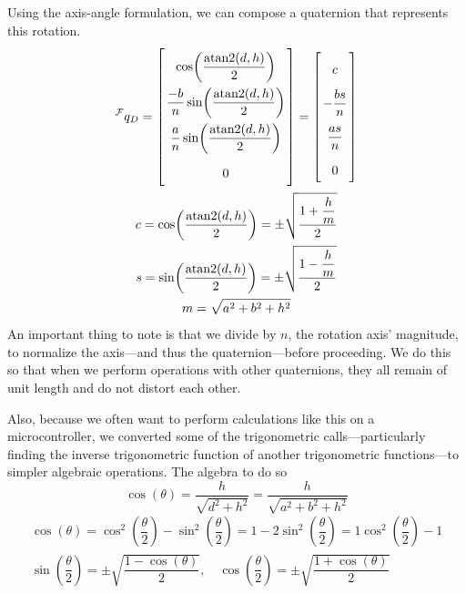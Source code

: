 \documentclass[letterpaper,10pt]{article}
\newcommand\leftidx[3]{%
  {\vphantom{#2}}#1#2#3%
}
\begin{document}
Using the axis-angle formulation, we can compose a quaternion that represents this rotation.
\begin{gather}
\leftidx{^\mathcal{F}}{q}{_{D}} = \left[\arraycolsep=1.4pt\def\arraystretch{2.2}\begin{array}{c} \cos\!\left(\dfrac{\mathrm{atan2}\!\left(d,h\right)}{2}\right) \\ \dfrac{-b}{n} \sin\!\left(\dfrac{\mathrm{atan2}\!\left(d,h\right)}{2}\right) \\ \dfrac{a}{n} \sin\!\left(\dfrac{\mathrm{atan2}\!\left(d,h\right)}{2}\right) \\ 0\end{array} \right] = \left[\arraycolsep=1.4pt\def\arraystretch{2.2}\begin{array}{c} c \\ -\dfrac{bs}{n} \\ \dfrac{as}{n} \\ 0 \end{array}\right] \\ 
c= \cos\!\left(\dfrac{\mathrm{atan2}\!\left(d,h\right)}{2}\right) = \pm \sqrt{\dfrac{1+\dfrac{h}{m}}{2}} \\
s=\sin\!\left(\dfrac{\mathrm{atan2}\!\left(d,h\right)}{2}\right) = \pm \sqrt{\dfrac{1-\dfrac{h}{m}}{2}}\\
m = \sqrt{a^2 + b^2 + h^2}
\end{gather}
An important thing to note is that we divide by $n$, the rotation axis' magnitude, to normalize the axis---and thus the quaternion---before proceeding. We do this so that when we perform operations with other quaternions, they all remain of unit length and do not distort each other.

Also, because we often want to perform calculations like this on a microcontroller, we converted some of the trigonometric calls---particularly finding the inverse trigonometric function of another trigonometric functions---to simpler algebraic operations. The algebra to do so 
\begin{equation}
\cos\!\left(\theta\right) = \dfrac{h}{\sqrt{d^2+h^2}} = \dfrac{h}{\sqrt{a^2+b^2+h^2}}
\end{equation}
\begin{gather}
\cos\!\left(\theta\right) = \cos^2\!\left(\dfrac{\theta}{2}\right) - \sin^2\!\left(\dfrac{\theta}{2}\right)  = 1 - 2\sin^2\!\left(\dfrac{\theta}{2}\right) = 1\cos^2\!\left(\dfrac{\theta}{2}\right) - 1\\
\sin\!\left(\dfrac{\theta}{2}\right) = \pm \sqrt{\dfrac{1-\cos\!\left(\theta\right)}{2}}, \quad \cos\!\left(\dfrac{\theta}{2}\right) = \pm \sqrt{\dfrac{1+\cos\!\left(\theta \right)}{2}}
\end{gather}
\end{document}
